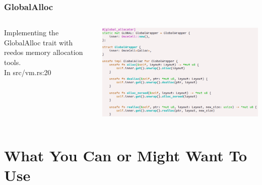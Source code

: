 \documentclass{beamer}
\begin{document}
\begin{frame}[fragile]
  \frametitle{GlobalAlloc}
  \begin{columns}
    \begin{column}{0.5\textwidth}
      Implementing the GlobalAlloc trait with reedos memory allocation
      tools.\\[5pt]
      In src/vm.rs:20
    \end{column}
    \begin{column}{0.5\textwidth}
      \includegraphics[width=\textwidth]{globalalloc_impl.png}
    \end{column}
  \end{columns}
\end{frame}

\section{What You Can or Might Want To Use}
\end{document}
